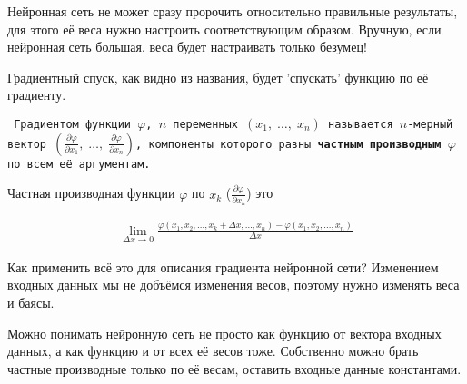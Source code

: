 \documentclass{article}
\begin{document}
        Нейронная сеть не может сразу пророчить относительно правильные результаты, для этого
        её веса нужно настроить соответствующим образом. Вручную, если нейронная сеть большая, 
        веса будет настраивать только безумец!

        Градиентный спуск, как видно из названия, будет 'спускать' функцию по её градиенту.

        \texttt{
            Градиентом функции $\varphi$, $n$ переменных $(x_{1},\;\ldots ,\;x_{n})$ называется $n$-мерный вектор
            $
                \left(
                    {\frac {\partial \varphi} {\partial x_{1}} }, \;
                    \ldots, \;
                    {\frac {\partial \varphi} {\partial x_{n}} }
                \right)
            $,
            компоненты которого равны \textbf{частным производным} $\varphi$ по всем её аргументам.
        }

        Частная производная функции $\varphi$ по $x_k$ 
        ($\frac {\partial \varphi} {\partial x_k}$) это

        \begin{align}
            \lim_{\varDelta x \to 0} {\frac{\varphi(x_1, x_2, \ldots, x_k+\varDelta x, \ldots, x_n) - \varphi(x_1, x_2, \ldots, x_n)}{\varDelta x}}
        \end{align}


        Как применить всё это для описания градиента нейронной сети?
        Изменением входных данных мы не добъёмся изменения весов, поэтому
        нужно изменять веса и баясы.

        Можно понимать нейронную сеть не просто как функцию от вектора входных
        данных, а как функцию и от всех её весов тоже.
        Собственно можно брать частные производные только по
        её весам, оставить входные данные константами.
\end{document}
